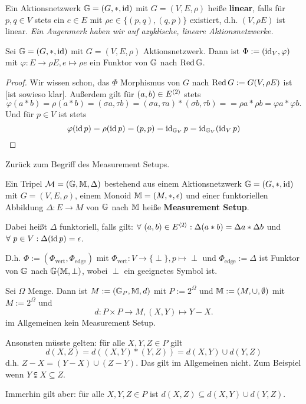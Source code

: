 \begin{definition}
    Ein Aktionsnetzwerk $\mathbb{G} =(G, \ast, \operatorname{id})$ mit $G =(V,E,\rho)$ heiße \textbf{linear}, falls für $p,q \in V$ stets ein $e \in E$ mit
    $\rho e \in \{(p,q),(q,p)\}$ existiert, d.h. $(V,\rho E)$ ist linear.
    \textit{Ein Augenmerk haben wir auf azyklische, lineare Aktionsnetzwerke.}
\end{definition}

\begin{proposition}
    Sei $\mathbb{G} = (G, \ast, \operatorname{id})$ mit $G=(V, E,\rho)$ Aktionsnetzwerk.
    Dann ist $\Phi := (\operatorname{id}_V, \varphi)$ mit $\varphi: E \to \rho E, e\mapsto \rho e$ ein Funktor von
    $\mathbb{G}$ nach $\operatorname{Red} \mathbb{G}$.
\end{proposition}
\begin{proof}
    Wir wissen schon, das $\Phi$ Morphismus von $G$ nach $\operatorname{Red} G := G(V, \rho E)$ ist [ist sowieso klar].
    Außerdem gilt für $(a,b) \in E^{\langle2\rangle}$ stets 
    $$ \varphi(a \ast b) = \rho (a\ast b) = (\sigma a, \tau b) = (\sigma a, \tau a) \ast (\sigma b, \tau b) = 
    = \rho a \ast \rho b = \varphi a \ast \varphi b.$$ 
    Und für $p \in V$ ist stets 
    $$ \varphi (\operatorname{id} p) = \rho(\operatorname{id} p) = (p,p)=\operatorname{id}_{\mathbb{G}_V}p = \operatorname{id}_{\mathbb{G}_V} (\operatorname{id}_V p)$$
\end{proof}

Zurück zum Begriff des Measurement Setups.
\begin{definition}
    Ein Tripel $\mathcal{M} =(\mathbb{G}, \mathbb{M}, \Delta)$ bestehend aus einem Aktionsnetzwerk $\mathbb{G} = (G, \ast, \operatorname{id})$ mit $G =(V,E,\rho)$, einem Monoid 
    $\mathbb{M} = (M, \ast, \epsilon)$ und einer funktoriellen Abbildung $\Delta: E \to M$ von $\mathbb{G}$ nach $\mathbb{M}$ heiße \textbf{Measurement Setup}.

    Dabei heißt $\Delta$ funktoriell, falls gilt: $\forall~(a,b)\in E^{\langle2\rangle} : \Delta (a\ast b) = \Delta a \ast \Delta b$ und
    $\forall~p\in V: \Delta (\operatorname{id} p) = \epsilon$.

    D.h. $\Phi := (\Phi_{\text{vert}}, \Phi_{\text{edge}})$ mit $\Phi_{\text{vert}}: V \to \{\perp\}, p \mapsto \perp$ und
    $\Phi_{\text{edge}} := \Delta$ ist Funktor von $\mathbb{G}$ nach $\mathbb{G}(\mathbb{M},\perp)$, wobei $\perp$ ein geeignetes Symbol ist.
\end{definition}

\begin{beispiel}[Gegenbeispiel]
    Sei $\Omega$ Menge. Dann ist $M:=(\mathbb{G}_P, \mathbb{M}, d)$ mit $P := 2^\Omega$ und $\mathbb{M} := (M, \cup, \emptyset)$ mit $M := 2^\Omega$ und
    $$ d: P \times P \to M, (X,Y) \mapsto Y - X. $$ im Allgemeinen kein Measurement Setup.
    
    Ansonsten müsste gelten: für alle $X,Y,Z \in P$ gilt $$d(X,Z) = d((X,Y) \ast (Y,Z)) = d(X,Y) \cup d(Y,Z)$$
    d.h. $Z-X = (Y-X)\cup (Z-Y)$.
    Das gilt im Allgemeinen nicht. Zum Beispiel wenn $Y \subsetneqq X \subseteq Z$.

    Immerhin gilt aber: für alle $X,Y,Z \in P$ ist $d(X,Z) \subseteq d(X,Y) \cup d(Y,Z)$.
\end{beispiel}

